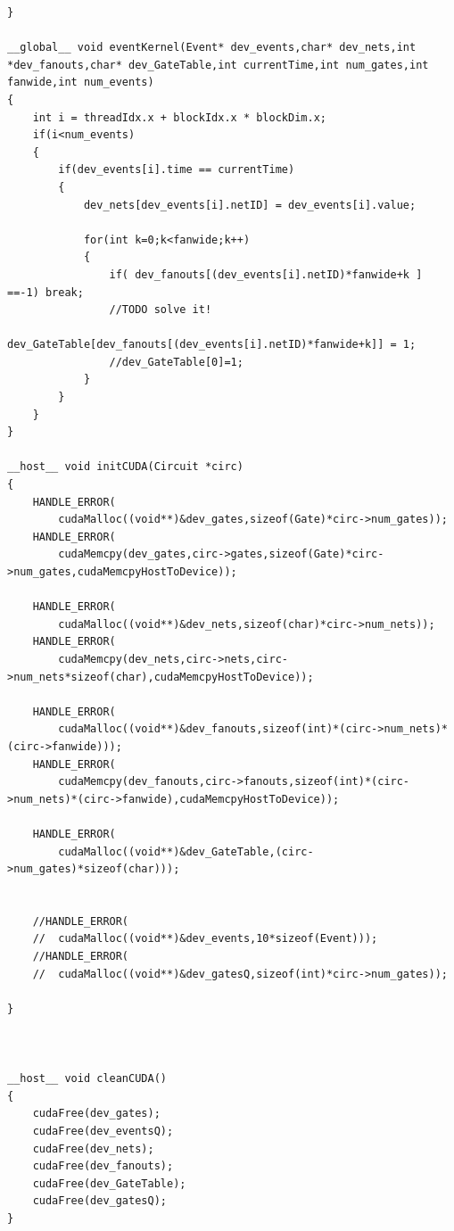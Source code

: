 \documentclass[a4paper,onesided,12pt]{report}
\begin{document}
\begin{verbatim}
}

__global__ void eventKernel(Event* dev_events,char* dev_nets,int *dev_fanouts,char* dev_GateTable,int currentTime,int num_gates,int fanwide,int num_events)
{
	int i = threadIdx.x + blockIdx.x * blockDim.x;
	if(i<num_events)
	{
		if(dev_events[i].time == currentTime)
		{
			dev_nets[dev_events[i].netID] = dev_events[i].value;

			for(int k=0;k<fanwide;k++)
			{
				if( dev_fanouts[(dev_events[i].netID)*fanwide+k ] ==-1) break;
				//TODO solve it!
				dev_GateTable[dev_fanouts[(dev_events[i].netID)*fanwide+k]] = 1;
				//dev_GateTable[0]=1;
			}
		}
	}
}

__host__ void initCUDA(Circuit *circ)
{
	HANDLE_ERROR(
		cudaMalloc((void**)&dev_gates,sizeof(Gate)*circ->num_gates));
	HANDLE_ERROR(
		cudaMemcpy(dev_gates,circ->gates,sizeof(Gate)*circ->num_gates,cudaMemcpyHostToDevice));

	HANDLE_ERROR(
		cudaMalloc((void**)&dev_nets,sizeof(char)*circ->num_nets));
	HANDLE_ERROR(
		cudaMemcpy(dev_nets,circ->nets,circ->num_nets*sizeof(char),cudaMemcpyHostToDevice));

	HANDLE_ERROR(
		cudaMalloc((void**)&dev_fanouts,sizeof(int)*(circ->num_nets)*(circ->fanwide)));
	HANDLE_ERROR(
		cudaMemcpy(dev_fanouts,circ->fanouts,sizeof(int)*(circ->num_nets)*(circ->fanwide),cudaMemcpyHostToDevice));

	HANDLE_ERROR(
		cudaMalloc((void**)&dev_GateTable,(circ->num_gates)*sizeof(char)));


	//HANDLE_ERROR(
	//	cudaMalloc((void**)&dev_events,10*sizeof(Event)));
	//HANDLE_ERROR(
	//	cudaMalloc((void**)&dev_gatesQ,sizeof(int)*circ->num_gates));
	
}



__host__ void cleanCUDA()
{
	cudaFree(dev_gates);
	cudaFree(dev_eventsQ);
	cudaFree(dev_nets);
	cudaFree(dev_fanouts);
	cudaFree(dev_GateTable);
	cudaFree(dev_gatesQ);
}



\end{verbatim}
\end{document}

